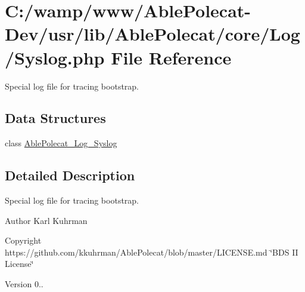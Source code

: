 \hypertarget{_syslog_8php}{}\section{C\+:/wamp/www/\+Able\+Polecat-\/\+Dev/usr/lib/\+Able\+Polecat/core/\+Log/\+Syslog.php File Reference}
\label{_syslog_8php}


Special log file for tracing bootstrap.  


\subsection*{Data Structures}
\begin{DoxyCompactItemize}
\item 
class \hyperlink{class_able_polecat___log___syslog}{Able\+Polecat\+\_\+\+Log\+\_\+\+Syslog}
\end{DoxyCompactItemize}


\subsection{Detailed Description}
Special log file for tracing bootstrap. 

\begin{DoxyAuthor}{Author}
Karl Kuhrman 
\end{DoxyAuthor}
\begin{DoxyCopyright}{Copyright}
https\+://github.com/kkuhrman/\+Able\+Polecat/blob/master/\+L\+I\+C\+E\+N\+S\+E.\+md \char`\"{}\+B\+D\+S I\+I License\char`\"{} 
\end{DoxyCopyright}
\begin{DoxyVersion}{Version}
0.. 
\end{DoxyVersion}
